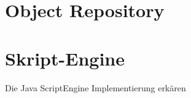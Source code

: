 \todo

\section{Object Repository}

\todo


\section{Skript-Engine}

Die Java ScriptEngine Implementierung erkären

\todo